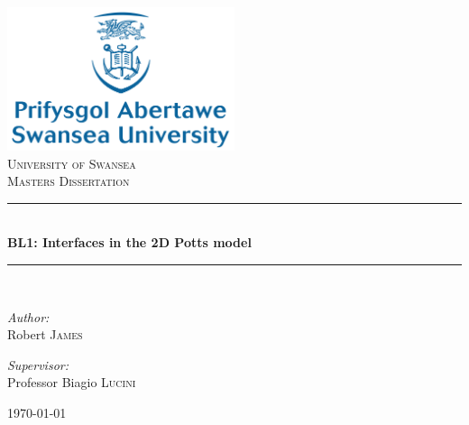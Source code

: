 \begin{titlepage}
\begin{center}
\newcommand{\HRule}{\rule{\linewidth}{0.5mm}}
\includegraphics[width=0.5\textwidth]{./SwanseaLogo}~\\[1cm]

\textsc{\LARGE University of Swansea}\\[1.5cm]

\textsc{\Large Masters Dissertation}\\[0.5cm]

\HRule \\[0.4cm]
{ \huge \bfseries BL1: Interfaces in the 2D Potts model \\[0.4cm] }

\HRule \\[1.5cm]

\noindent
\begin{minipage}{0.4\textwidth}
\begin{flushleft} \large
\emph{Author:}\\
Robert \textsc{James}
\end{flushleft}
\end{minipage}%
\begin{minipage}{0.4\textwidth}
\begin{flushright} \large
\emph{Supervisor:} \\
Professor Biagio \textsc{Lucini}
\end{flushright}
\end{minipage}

\vfill

{\large \today}

\end{center}

\clearpage

\end{titlepage}
